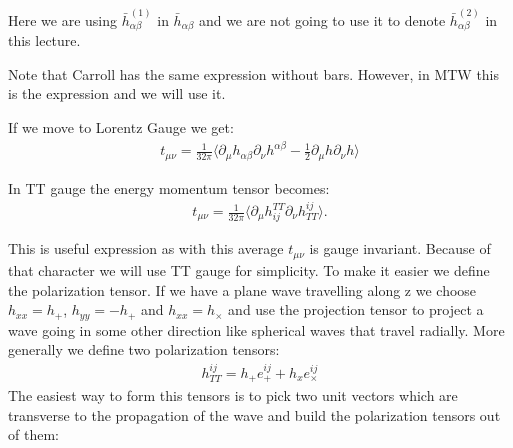 \documentclass[11pt]{article}
\begin{document}
Here we are using $\bar{h}^{(1)}_{\alpha\beta}$ in $\bar{h}_{\alpha\beta}$ and we are not going to use it to denote $\bar{h}^{(2)}_{\alpha\beta}$  in this lecture.

Note that Carroll has the same expression without bars. However, in MTW this is the expression and we will use it.

If we move to Lorentz Gauge we get:
\begin{align}
t_{\mu\nu}= \frac{1}{32\pi}\langle \partial_\mu h_{\alpha\beta}\partial_\nu h^{\alpha\beta}- \frac{1}{2}\partial_\mu h\partial_\nu h \rangle
\end{align}

In TT gauge the energy momentum tensor becomes:
\begin{align}
t_{\mu\nu}= \frac{1}{32\pi}\langle \partial_\mu h^{TT}_{ij}\partial_\nu h^{ij}_{TT}\rangle .\label{TTgauge}
\end{align}

This is useful expression as with this average $t_{\mu\nu}$ is gauge invariant. Because of that character we will use TT gauge for simplicity. To make it easier we define the polarization tensor. If we have a plane wave travelling along z we choose $h_{xx}=h_+$, $h_{yy}=-h_+$ and $h_{xx}=h_\times$ and use the projection tensor to project a wave going in some other direction like spherical waves that travel radially.
More generally we define two polarization tensors:
\begin{align}
h^{ij}_{TT} = h_+e^{ij}_+ +h_xe^{ij}_\times
\end{align}
The easiest way to form this tensors is to pick two unit vectors which are transverse to the propagation of the wave and build the polarization tensors out of them:
\end{document}
